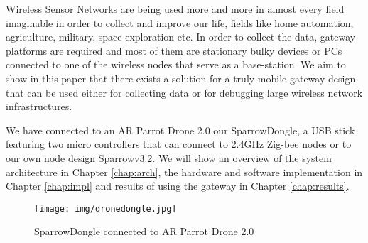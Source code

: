 Wireless Sensor Networks are being used more and more in almost every field imaginable in order to collect and improve our life, fields like home automation, agriculture, military, space exploration etc. In order to collect the data, gateway platforms \cite{hill2004platforms,da2011design,da2011design2} are required and most of them are stationary bulky devices or PCs connected to one of the wireless nodes that serve as a base-station. We aim to show in this paper that there exists a solution for a truly mobile gateway design that can be used either for collecting data or for debugging large wireless network infrastructures.

We have connected to an AR Parrot Drone 2.0 our SparrowDongle, a USB stick featuring two micro controllers that can connect to 2.4GHz Zig-bee nodes or to our own node design Sparrowv3.2. We will show an overview of the system
architecture in Chapter \ref{chap:arch}, the hardware and software
implementation in Chapter \ref{chap:impl} and results of using the gateway in
Chapter \ref{chap:results}. 

\begin{figure}[ht] \centering
\texttt{[image: img/dronedongle.jpg]} \caption{SparrowDongle connected to AR Parrot Drone 2.0 } \end{figure}


